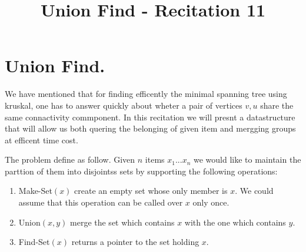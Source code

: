 \title{Union Find - Recitation 11} 

\usetikzlibrary{positioning, arrows}

\iffalse
  \newtheorem{prop}{Proposition}
  \newtheorem{ex}{Exercise}
  \newtheorem{sol}{Solution}
  \newtheorem{theorem}{Theorem} \newtheorem{thm}{Theorem}[section]
  \newtheorem{conj}[thm]{Conjecture} \newtheorem{lemma}[thm]{Lemma}
  \newtheorem{corollary}[thm]{Corollary} \newtheorem{claim}[thm]{Claim}
  \newtheorem{proposition}[thm]{Proposition}
  \newtheorem{definition}{Definition} \newtheorem{remark}{Remark}

  \pagestyle{empty}

  \setlength{\textwidth}{6.5in}
  \setlength{\evensidemargin}{0.0in}
  \setlength{\oddsidemargin}{0.0in}
  \setlength{\topmargin}{-0.25in}
  \setlength{\textheight}{9.0in}
  \setlength{\baselineskip}{1.3\baselineskip}
  \setlength{\parindent}{.0in}
\fi
{}

\def\LinkedList#1{%
  \foreach \element in \list {
    \node[node of list, right = of aux, name=ele] {\element};
    \draw[link] (aux) -- (ele);
    \coordinate (aux) at (ele.east);
  } 
}








\section{Union Find.} 

We have mentioned that for finding efficently the minimal spanning tree using kruskal, one has to answer quickly about wheter a pair of vertices $v,u$ share the same connactivity commponent. In this recitation we will presnt a datastructure that will allow us both quering the belonging of given item and mergging groups at efficent time cost. 

The problem define as follow. Given $n$ items $x_1 ... x_{n}$ we would like to maintain the parttion of them into disjointss sets by supporting the following operations:  
\begin{enumerate}
  \item Make-Set$(x)$ create an empty set whose only member is $x$. We could assume that this operation can be called over $x$ only once. 
  \item Union$(x,y)$ merge the set which contains $x$ with the one which contains $y$. 
  \item Find-Set$(x)$ returns a pointer to the set holding $x$. 
\end{enumerate}

